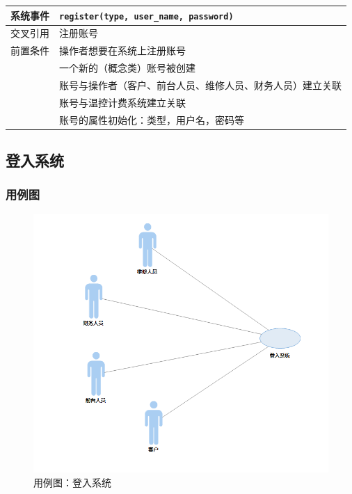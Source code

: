 \documentclass[black,normal,cn]{elegantnote}
\newcommand{\code}[1]{\colorbox{light-gray}{\texttt{#1}}}
\begin{document}
\begin{center}
    \begin{tabular}{|>{\centering}m{}|m{}|}
        \hline
        系统事件                  & \multicolumn{1}{l|}{\code{register(type, user\_name, password)}} \\
        \hline
        交叉引用                  & 注册账号                                                         \\
        \hline
        前置条件                  & 操作者想要在系统上注册账号                                       \\
        \hline
        \multirow{4}{*}{后置条件} & 一个新的（概念类）账号被创建                                     \\
        \cline{2-2}
                                  & 账号与操作者（客户、前台人员、维修人员、财务人员）建立关联       \\
        \cline{2-2}
                                  & 账号与温控计费系统建立关联                                       \\
        \cline{2-2}
                                  & 账号的属性初始化：类型，用户名，密码等                           \\
        \hline
    \end{tabular}
\end{center}

\subsection{登入系统}
\subsubsection{用例图}

\begin{figure}[H]
    \centering
    \includegraphics[width=.5\textwidth]{fig/276007.png}
    \caption{用例图：登入系统}
    \label{fig:276007}
\end{figure}
\end{document}
